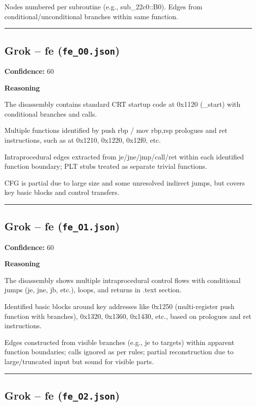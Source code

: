 Nodes numbered per subroutine (e.g., sub\_22c0::B0). Edges from conditional/unconditional branches within same function.

\bigskip
\hrule
\bigskip

\subsection{Grok -- fe (\texttt{fe\_O0.json})}

\textbf{Confidence:} 60

\textbf{Reasoning}

The disassembly contains standard CRT startup code at 0x1120 (\_start) with conditional branches and calls.

Multiple functions identified by push rbp / mov rbp,rsp prologues and ret instructions, such as at 0x1210, 0x1220, 0x12f0, etc.

Intraprocedural edges extracted from je/jne/jmp/call/ret within each identified function boundary; PLT stubs treated as separate trivial functions.

CFG is partial due to large size and some unresolved indirect jumps, but covers key basic blocks and control transfers.

\bigskip
\hrule
\bigskip

\subsection{Grok -- fe (\texttt{fe\_O1.json})}

\textbf{Confidence:} 60

\textbf{Reasoning}

The disassembly shows multiple intraprocedural control flows with conditional jumps (je, jne, jb, etc.), loops, and returns in .text section.

Identified basic blocks around key addresses like 0x1250 (multi-register push function with branches), 0x1320, 0x1360, 0x1430, etc., based on prologues and ret instructions.

Edges constructed from visible branches (e.g., je to targets) within apparent function boundaries; calls ignored as per rules; partial reconstruction due to large/truncated input but sound for visible parts.

\bigskip
\hrule
\bigskip

\subsection{Grok -- fe (\texttt{fe\_O2.json})}

